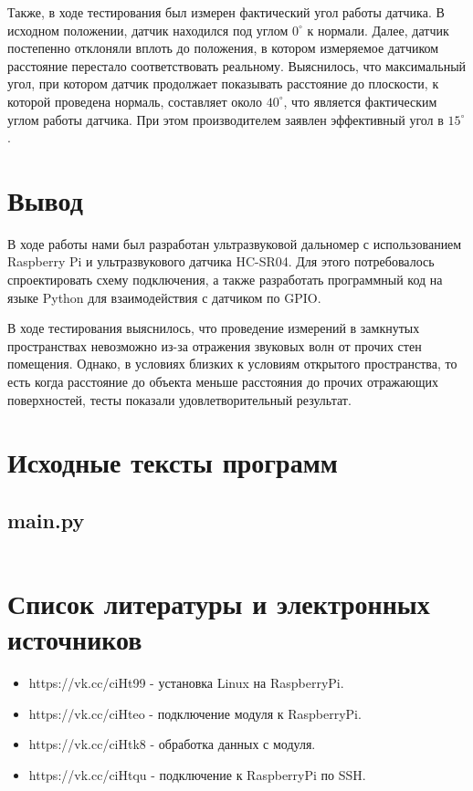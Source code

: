 \documentclass[a4paper, 14pt]{article}
\begin{document}
Также, в ходе тестирования был измерен фактический угол работы датчика. В исходном положении, датчик находился под углом $0^\circ$ к нормали. Далее, датчик постепенно отклоняли вплоть до положения, в котором измеряемое датчиком расстояние перестало соответствовать реальному.
Выяснилось, что максимальный угол, при котором датчик продолжает показывать расстояние до плоскости, к  которой проведена нормаль, составляет около $40^\circ$, что является фактическим углом работы датчика. При этом производителем заявлен эффективный угол в $15^\circ$.
\newpage
\section{Вывод}

В ходе работы нами был разработан ультразвуковой дальномер с использованием Raspberry Pi и ультразвукового датчика HC-SR04. Для этого потребовалось спроектировать схему подключения, а также разработать программный код на языке Python для взаимодействия с датчиком по GPIO.

В ходе тестирования выяснилось, что проведение измерений в замкнутых пространствах невозможно из-за отражения звуковых волн от прочих стен помещения. Однако, в условиях близких к условиям открытого пространства, то есть когда расстояние до объекта меньше расстояния до прочих отражающих поверхностей, тесты показали удовлетворительный результат.

\newpage
\section{Исходные тексты программ}

\subsection{main.py}
\normalsize
\inputminted[frame=single]{python}{../src/main.py}
\Large
\newpage
\section{Список литературы и электронных источников}

\begin{itemize}
	\item https://vk.cc/ciHt99 - установка Linux на RaspberryPi.
	\item https://vk.cc/ciHteo - подключение модуля к RaspberryPi.
	\item https://vk.cc/ciHtk8 - обработка данных с модуля.
	\item https://vk.cc/ciHtqu - подключение к RaspberryPi по SSH.
\end{itemize}
\end{document}
